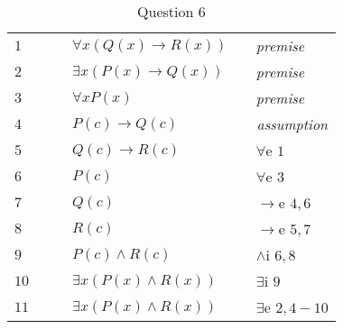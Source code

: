 \documentclass[12pt]{article}
\begin{document}
\begin{table}[H]
	\centering
	\caption{Question 6}
	\begin{tabular}{*6{l}}
		\cline{2-6}
		\cline{2-6}
		$1$ & & & $\forall x (Q(x) \rightarrow R(x))$ & & \textit{premise}  \\ 
		
		$2$ & & & $\exists x (P(x) \rightarrow Q(x))$ & & \textit{premise}  \\ 
				
		$3$ & & & $\forall x P(x)$ & & \textit{premise}  \\ \cline{2-6}
		
		$4$ &\multicolumn{1}{|c}{} & & $P(c) \rightarrow Q(c)$ & &\multicolumn{1}{c|}{\textit{assumption}}\\ 
		 
		$5$ &\multicolumn{1}{|c}{} & & $Q(c) \rightarrow R(c)$ &  &\multicolumn{1}{l|}{$\forall$e $1$}\\ 
		
		$6$ &\multicolumn{1}{|c}{} & & $P(c)$ & &\multicolumn{1}{l|}{$\forall$e $$3}\\
		
		$7$ &\multicolumn{1}{|c}{}  & & $Q(c)$ &  &\multicolumn{1}{l|}{$\rightarrow$e $4,6$}\\ 
		
		$8$ &\multicolumn{1}{|c}{} & & $R(c)$ & &\multicolumn{1}{l|}{$\rightarrow$e $5,7$}\\ 
		
		$9$ &\multicolumn{1}{|c}{} & & $P(c) \land R(c)$ & &\multicolumn{1}{l|}{$\land$i $6,8$}\\ 
		 
		$10$ &\multicolumn{1}{|c}{}& & $\exists x (P(x) \land R(x))$ &&\multicolumn{1}{l|}{$\exists$i $9$}\\ \cline{2-6}
		
		$11$ && & $\exists x (P(x) \land R(x))$ && $\exists$e $2,4-10$\\ 
	
	

	\end{tabular}
\end{table}

	
	
	
	
	
	
	
	
	
	
\end{document}
